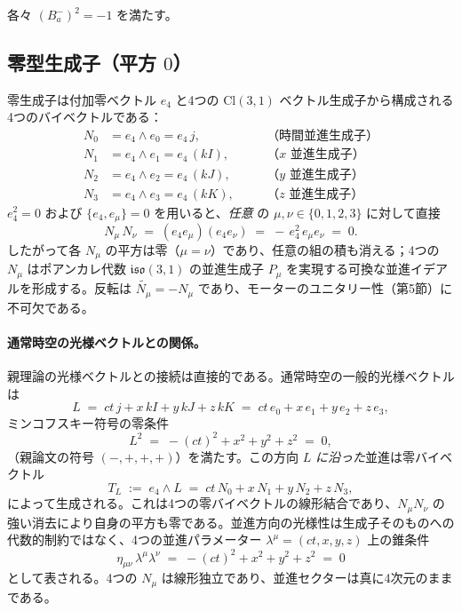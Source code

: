 \documentclass[dvipdfmx,11pt,a4paper]{article}
\theoremstyle{definition}
\theoremstyle{plain}
\theoremstyle{remark}
\begin{document}
各々 $(B_{a}^{-})^{2} = -1$ を満たす。

\subsection{零型生成子（平方 $0$）}

零生成子は付加零ベクトル $e_{4}$ と4つの $\mathrm{Cl}(3,1)$ ベクトル生成子から構成される4つのバイベクトルである：
\begin{align*}
N_{0} &= e_{4}\wedge e_{0} = e_{4}\,j,         &\quad& \text{（時間並進生成子）}\\
N_{1} &= e_{4}\wedge e_{1} = e_{4}\,(kI),      &\quad& \text{（$x$ 並進生成子）}\\
N_{2} &= e_{4}\wedge e_{2} = e_{4}\,(kJ),      &\quad& \text{（$y$ 並進生成子）}\\
N_{3} &= e_{4}\wedge e_{3} = e_{4}\,(kK),      &\quad& \text{（$z$ 並進生成子）}
\end{align*}
$e_{4}^{2}=0$ および $\{e_{4},e_{\mu}\}=0$ を用いると、\emph{任意} の $\mu,\nu\in\{0,1,2,3\}$ に対して直接
\[
N_{\mu}\,N_{\nu} \;=\; (e_{4}e_{\mu})(e_{4}e_{\nu}) \;=\; -\,e_{4}^{2}\,e_{\mu}e_{\nu} \;=\; 0.
\]
したがって各 $N_{\mu}$ の平方は零（$\mu=\nu$）であり、任意の組の積も消える；4つの $N_{\mu}$ はポアンカレ代数 $\mathfrak{iso}(3,1)$ の並進生成子 $P_{\mu}$ を実現する可換な並進イデアルを形成する。反転は $\widetilde{N_{\mu}}=-N_{\mu}$ であり、モーターのユニタリー性（第5節）に不可欠である。

\paragraph{通常時空の光様ベクトルとの関係。}
親理論の光様ベクトルとの接続は直接的である。通常時空の一般的光様ベクトルは
\[
L \;=\; ct\,j + x\,kI + y\,kJ + z\,kK \;=\; ct\,e_{0} + x\,e_{1} + y\,e_{2} + z\,e_{3},
\]
ミンコフスキー符号の零条件
\[
L^{2} \;=\; -(ct)^{2} + x^{2} + y^{2} + z^{2} \;=\; 0,
\]
（親論文の符号 $(-,+,+,+)$）を満たす。この方向 $L$ \emph{に沿った}並進は零バイベクトル
\[
T_{L} \;:=\; e_{4}\wedge L \;=\; ct\,N_{0} + x\,N_{1} + y\,N_{2} + z\,N_{3},
\]
によって生成される。これは4つの零バイベクトルの線形結合であり、$N_{\mu}N_{\nu}$ の強い消去により自身の平方も零である。並進方向の光様性は生成子そのものへの代数的制約ではなく、4つの並進パラメーター $\lambda^{\mu}=(ct,x,y,z)$ 上の錐条件
\[
\eta_{\mu\nu}\,\lambda^{\mu}\lambda^{\nu} \;=\; -(ct)^{2}+x^{2}+y^{2}+z^{2} \;=\; 0
\]
として表される。4つの $N_{\mu}$ は線形独立であり、並進セクターは真に4次元のままである。
\end{document}

